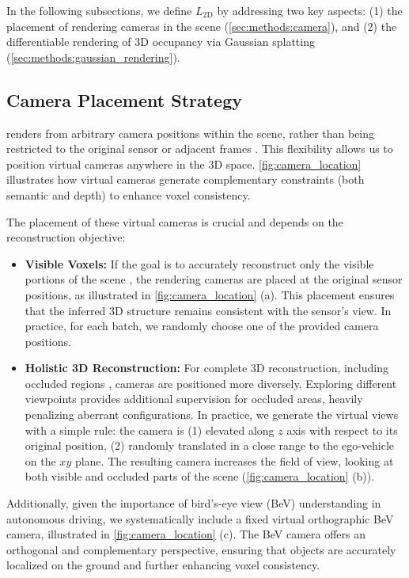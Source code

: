 In the following subsections, we define \(L_{\text{2D}}\) by addressing two key aspects: (1) the placement of rendering cameras in the scene (\autoref{sec:methods:camera}), and (2) the differentiable rendering of 3D occupancy via Gaussian splatting (\autoref{sec:methods:gaussian_rendering}).

\subsection{Camera Placement Strategy}
\label{sec:methods:camera}
\method{} renders from arbitrary camera positions within the scene, rather than being restricted to the original sensor or adjacent frames \citep{pan2024renderocc, huang2024selfocc, sun2024gsrender}. This flexibility allows us to position virtual cameras anywhere in the 3D space.
\autoref{fig:camera_location} illustrates {how virtual cameras generate complementary constraints (both semantic and depth) to enhance voxel consistency.}



The placement of these virtual cameras is crucial and depends on the reconstruction objective:
\begin{itemize}
    \item \textbf{Visible Voxels:} If the goal is to accurately reconstruct only the visible portions of the scene \citep{tian2023occ3d, li2024sscbench}, the rendering cameras are placed 
    {at} the original sensor positions{, as illustrated in \autoref{fig:camera_location} (a)}. 
    This placement ensures that the inferred 3D structure remains consistent with the sensor's view. 
    In practice, for each batch, we randomly choose one of the provided camera {positions.} %
    \item \textbf{Holistic 3D Reconstruction:} For complete 3D reconstruction, including occluded regions \citep{wei2023surroundocc}, cameras are positioned more diversely. Exploring different viewpoints provides additional supervision for occluded areas, heavily penalizing aberrant configurations.
    {In practice, we generate the virtual views with a simple rule: the camera is 
    {(1) elevated along $z$ axis with respect to its original position, (2) randomly translated in a close range to the ego-vehicle on the $xy$ plane. 
    }
    The resulting camera increases the field of view, looking at both visible and occluded parts of the scene (\autoref{fig:camera_location} (b)).}
\end{itemize}

Additionally, given the importance of bird's-eye view (BeV) understanding in autonomous driving, we systematically include a fixed virtual {orthographic} BeV camera{, illustrated in \autoref{fig:camera_location} (c)}. The BeV camera offers an orthogonal and complementary perspective, ensuring that objects are accurately localized on the ground and further enhancing voxel consistency.

